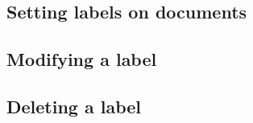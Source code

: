 \documentclass[10pt,a4paper]{article}
\begin{document}
\subsection{Setting labels on documents}



\subsection{Modifying a label}



\subsection{Deleting a label}
\end{document}
